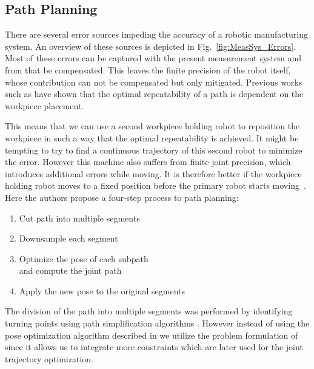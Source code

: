 \documentclass[5p,times,procedia]{elsarticle}
\newcommand{\rem}[1]{\textcolor{red}{\sout{#1}}}
\begin{document}
\subsection{Path Planning}\label{subsec:PathPlanning}
There are several error sources impeding the accuracy of a robotic manufacturing system.
An overview of these sources is depicted in Fig.~\ref{fig:MeasSys_Errors}.
Most of these errors can be captured with the present measurement system and from that be compensated.
%
This leaves the finite precision of the robot itself, whose contribution can not be compensated but only mitigated.
Previous works such as \cite{previous_work} have shown that the optimal repeatability of a path is dependent on the workpiece placement.

This means that we can use a second workpiece holding robot to reposition the workpiece in such a way that the optimal repeatability is achieved.
It might be tempting to try to find a continuous trajectory of this second robot to minimize the error.
However this machine also suffers from finite joint precision, which introduces additional errors while moving.
It is therefore better if the workpiece holding robot moves to a fixed position before the primary robot starts moving~\cite{stroke_division}. %
\\
Here the authors propose a four-step process to path planning:
\begin{enumerate}
	\setlength\itemsep{-0.5em}
	\item Cut path into multiple segments
	\item Downsample each segment
	\item Optimize the pose of each subpath\\and compute the joint path
	\item Apply the new pose to the original segments
\end{enumerate}
The division of the path into multiple segments was performed by identifying turning points using path simplification algorithms \cite{stroke_division}.
However instead of using the pose optimization algorithm described in \cite{stroke_division} we utilize the problem formulation of \cite{previous_work} since it allows us to integrate more constraints which are later used for the joint trajectory optimization.
%
%
%
%
\end{document}
